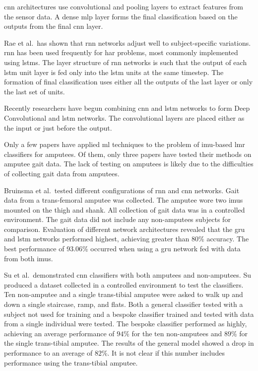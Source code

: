 \acrshort{cnn} architectures use convolutional and pooling layers to extract features from the sensor data. A dense \acrshort{mlp} layer forms the final classification based on the outputs from the final \acrshort{cnn} layer. \cite{Jiang2015, Lu2020, Martinez-Hernandez2021} 

Rae et al.~has shown that \acrshort{rnn} networks adjust well to subject-specific variations\cite{Rai2019a}. \acrshort{rnn} has been used frequently for \acrshort{har} problems, most commonly implemented using \acrshort{lstm}s. The layer structure of \acrshort{rnn} networks is such that the output of each \acrshort{lstm} unit layer is fed only into the \acrshort{lstm} units at the same timestep. The formation of final classification uses either all the outputs of the last layer or only the last set of units.\cite{Yu2018, Uddin2021a}

Recently researchers have begun combining \acrshort{cnn} and \acrshort{lstm} networks to form Deep Convolutional and \acrshort{lstm} networks\cite{Ordonez2016}. The convolutional layers are placed either as the input or just before the output.\cite{Mutegeki2020, Xia2020}


Only a few papers have applied \acrshort{ml} techniques to the problem of \acrshort{imu}-based \acrshort{lmr} classifiers for amputees. Of them, only three papers have tested their methods on amputee gait data\cite{Lu2020, Bruinsma2021, Jamieson2021}. The lack of testing on amputees is likely due to the difficulties of collecting gait data from amputees\cite{Gardiner2016}.

Bruinsma et al.~tested different configurations of \acrshort{rnn} and \acrshort{cnn} networks. Gait data from a trans-femoral amputee was collected. The amputee wore two \acrshort{imu}s mounted on the thigh and shank. All collection of gait data was in a controlled environment. The gait data did not include any non-amputees subjects for comparison. Evaluation of different network architectures revealed that the \acrfull{gru} and \acrshort{lstm} networks performed highest, achieving greater than 80\% accuracy. The best performance of  93.06\% occurred when using a \acrshort{gru} network fed with data from both \acrshort{imu}s.\cite{Bruinsma2021}

Su et al.~demonstrated \acrshort{cnn} classifiers with both amputees and non-amputees. Su produced a dataset collected in a controlled environment to test the classifiers. Ten non-amputee and a single trans-tibial amputee were asked to walk up and down a single staircase, ramp, and flats. Both a general classifier tested with a subject not used for training and a bespoke classifier trained and tested with data from a single individual were tested. The bespoke classifier performed as highly, achieving an average performance of $94\%$ for the ten non-amputees and $89\%$ for the single trans-tibial amputee. The results of the general model showed a drop in performance to an average of $82\%$. It is not clear if this number includes performance using the trans-tibial amputee.\cite{Su2019}

